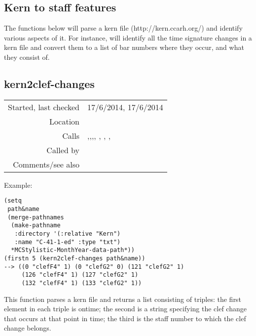 \subsection{Kern to staff features}\label{sec:kern-to-staff-features}

The functions below will parse a kern
file (http://kern.ccarh.org/) and identify various
aspects of it. For instance,
 will
identify all the time signature changes in a kern
file and convert them to a list of bar numbers where
they occur, and what they consist of.


\subsection*{kern2clef-changes}\label{fun:kern2clef-changes}

\vspace{0.3cm}
\begin{tabular}{r|p{8cm}}
Started, last checked & 17/6/2014, 17/6/2014 \\
Location & \nameref{sec:kern-to-staff-features} \\
Calls & \nameref{fun:kern-anacrusis-correction},\newline \nameref{fun:kern-col2staff-changes},\newline \nameref{fun:kern-rows2col-preserving-clefs},\newline \nameref{fun:read-from-file-arbitrary}, \nameref{fun:sort-dataset-asc}, \newline \nameref{fun:staves-info2staves-variable-robust}, \newline \nameref{fun:tab-separated-string2list}, \nameref{fun:test-all-true} \\
Called by & \\
Comments/see also &
\end{tabular}

\vspace{0.5cm}
\noindent Example:
\begin{verbatim}
(setq
 path&name
 (merge-pathnames
  (make-pathname
   :directory '(:relative "Kern")
   :name "C-41-1-ed" :type "txt")
  *MCStylistic-MonthYear-data-path*))
(firstn 5 (kern2clef-changes path&name))
--> ((0 "clefF4" 1) (0 "clefG2" 0) (121 "clefG2" 1)
     (126 "clefF4" 1) (127 "clefG2" 1)
     (132 "clefF4" 1) (133 "clefG2" 1))
\end{verbatim}

\noindent This function parses a kern file and returns a list
consisting of triples: the first element in each
triple is ontime; the second is a string specifying
the clef change that occurs at that point in time;
the third is the staff number to which the clef
change belongs.


